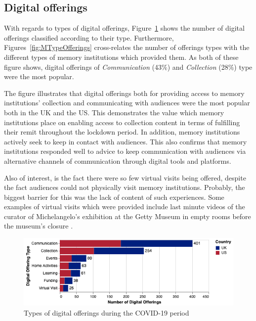 \documentclass{egpubl}
\begin{document}

\subsection{Digital offerings}
With regards to types of digital offerings, Figure~\ref{fig:DigOffType} shows the number of digital offerings classified according to their type. Furthermore, Figures~\ref{fig:MTypeOfferings} cross-relates the number of offerings types with the different types of memory institutions which provided them. As both of these figure shows, digital offerings of \emph{Communication} (43\%) and \emph{Collection} (28\%) type were the most popular. 

The figure illustrates that digital offerings both for providing access to memory institutions' collection and communicating with audiences were the most popular both in the UK and the US. This demonstrates the value which memory institutions place on enabling access to collection content in terms of fulfilling their remit throughout the lockdown period. In addition, memory institutions actively seek to keep in contact with audiences. This also confirms that memory institutions responded well to advice to keep communication with audiences via alternative channels of communication through digital tools and platforms. 


Also of interest, is the fact there  were so few virtual visits being offered, despite the fact audiences could not physically visit memory institutions. Probably, the biggest barrier for this was the lack of content of such experiences. Some examples of virtual visits which were provided include last minute videos of the curator of Michelangelo's exhibition at the Getty Museum in empty rooms before the museum's closure \cite{getty2020}.





\begin{figure}[h]
  \centering
  \includegraphics[width=\linewidth]{images/digitalTypes.png}
  \caption{\label{fig:DigOffType}
           Types of digital offerings during the COVID-19 period}
\end{figure}
\end{document}
